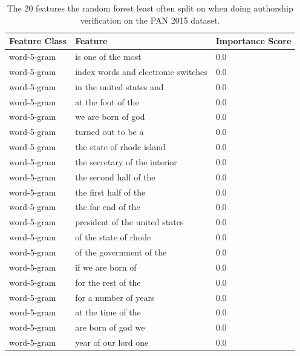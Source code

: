 \begin{table}
    \centering
    \begin{tabular}{lll}
        \textbf{Feature Class} & \textbf{Feature} & \textbf{Importance Score} \\
        \hline
        word-5-gram & is one of the most                  & 0.0 \\
        word-5-gram & index words and electronic switches & 0.0 \\
        word-5-gram & in the united states and            & 0.0 \\
        word-5-gram & at the foot of the                  & 0.0 \\
        word-5-gram & we are born of god                  & 0.0 \\
        word-5-gram & turned out to be a                  & 0.0 \\
        word-5-gram & the state of rhode island           & 0.0 \\
        word-5-gram & the secretary of the interior       & 0.0 \\
        word-5-gram & the second half of the              & 0.0 \\
        word-5-gram & the first half of the               & 0.0 \\
        word-5-gram & the far end of the                  & 0.0 \\
        word-5-gram & president of the united states      & 0.0 \\
        word-5-gram & of the state of rhode               & 0.0 \\
        word-5-gram & of the government of the            & 0.0 \\
        word-5-gram & if we are born of                   & 0.0 \\
        word-5-gram & for the rest of the                 & 0.0 \\
        word-5-gram & for a number of years               & 0.0 \\
        word-5-gram & at the time of the                  & 0.0 \\
        word-5-gram & are born of god we                  & 0.0 \\
        word-5-gram & year of our lord one                & 0.0
    \end{tabular}
    \caption{The 20 features the random forest least often split on when doing
    authorship verification on the PAN 2015 dataset.}
    \label{tab:feature_non_importance}
\end{table}

